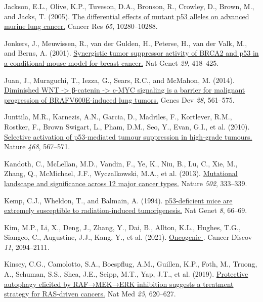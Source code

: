 \begin{CSLReferences}{0}{0}
\leavevmode{}%
Jackson, E.L., Olive, K.P., Tuveson, D.A., Bronson, R., Crowley, D., Brown, M., and Jacks, T. (2005). \href{https://doi.org/10.1158/0008-5472.can-05-2193}{The differential effects of mutant p53 alleles on advanced murine lung cancer.} Cancer Res \emph{65}, 10280--10288.

\leavevmode{}%
Jonkers, J., Meuwissen, R., van der Gulden, H., Peterse, H., van der Valk, M., and Berns, A. (2001). \href{https://doi.org/10.1038/ng747}{Synergistic tumor suppressor activity of BRCA2 and p53 in a conditional mouse model for breast cancer.} Nat Genet \emph{29}, 418--425.

\leavevmode{}%
Juan, J., Muraguchi, T., Iezza, G., Sears, R.C., and McMahon, M. (2014). \href{https://doi.org/10.1101/gad.233627.113}{Diminished WNT -\textgreater{} β-catenin -\textgreater{} c-MYC signaling is a barrier for malignant progression of BRAFV600E-induced lung tumors.} Genes Dev \emph{28}, 561--575.

\leavevmode{}%
Junttila, M.R., Karnezis, A.N., Garcia, D., Madriles, F., Kortlever, R.M., Rostker, F., Brown Swigart, L., Pham, D.M., Seo, Y., Evan, G.I., et al. (2010). \href{https://doi.org/10.1038/nature09526}{Selective activation of p53-mediated tumour suppression in high-grade tumours.} Nature \emph{468}, 567--571.

\leavevmode{}%
Kandoth, C., McLellan, M.D., Vandin, F., Ye, K., Niu, B., Lu, C., Xie, M., Zhang, Q., McMichael, J.F., Wyczalkowski, M.A., et al. (2013). \href{https://doi.org/10.1038/nature12634}{Mutational landscape and significance across 12 major cancer types.} Nature \emph{502}, 333--339.

\leavevmode{}%
Kemp, C.J., Wheldon, T., and Balmain, A. (1994). \href{https://doi.org/10.1038/ng0994-66}{p53-deficient mice are extremely susceptible to radiation-induced tumorigenesis.} Nat Genet \emph{8}, 66--69.

\leavevmode{}%
Kim, M.P., Li, X., Deng, J., Zhang, Y., Dai, B., Allton, K.L., Hughes, T.G., Siangco, C., Augustine, J.J., Kang, Y., et al. (2021). \href{https://doi.org/10.1158/2159-8290.cd-20-1228}{Oncogenic }. Cancer Discov \emph{11}, 2094--2111.

\leavevmode{}%
Kinsey, C.G., Camolotto, S.A., Boespflug, A.M., Guillen, K.P., Foth, M., Truong, A., Schuman, S.S., Shea, J.E., Seipp, M.T., Yap, J.T., et al. (2019). \href{https://doi.org/10.1038/s41591-019-0367-9}{Protective autophagy elicited by RAF→MEK→ERK inhibition suggests a treatment strategy for RAS-driven cancers.} Nat Med \emph{25}, 620--627.


\end{CSLReferences}
